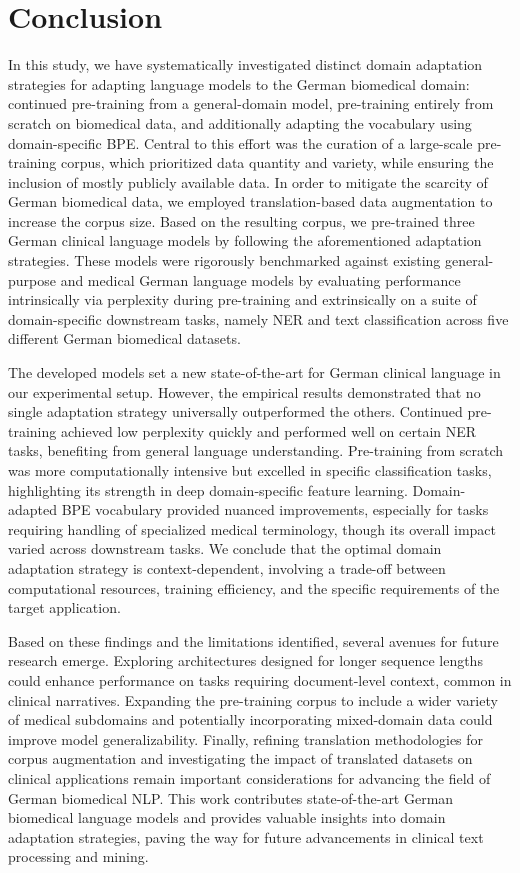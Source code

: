 \chapter{Conclusion} \label{chap:conclusion}

In this study, we have systematically investigated distinct domain adaptation
strategies for adapting language models to the German biomedical domain:
continued pre-training from a general-domain model, pre-training entirely from
scratch on biomedical data, and additionally adapting the vocabulary using
domain-specific BPE. Central to this effort was the curation of a large-scale
pre-training corpus, which prioritized data quantity and variety, while ensuring
the inclusion of mostly publicly available data. In order to mitigate the
scarcity of German biomedical data, we employed translation-based data
augmentation to increase the corpus size. Based on the resulting corpus, we
pre-trained three German clinical language models by following the
aforementioned adaptation strategies. These models were rigorously benchmarked
against existing general-purpose and medical German language models by
evaluating performance intrinsically via perplexity during pre-training and
extrinsically on a suite of domain-specific downstream tasks, namely NER and
text classification across five different German biomedical datasets.

The developed models set a new state-of-the-art for German clinical language in
our experimental setup. However, the empirical results demonstrated that no
single adaptation strategy universally outperformed the others. Continued
pre-training achieved low perplexity quickly and performed well on certain NER
tasks, benefiting from general language understanding. Pre-training from scratch
was more computationally intensive but excelled in specific classification
tasks, highlighting its strength in deep domain-specific feature learning.
Domain-adapted BPE vocabulary provided nuanced improvements, especially for
tasks requiring handling of specialized medical terminology, though its overall
impact varied across downstream tasks. We conclude that the optimal domain
adaptation strategy is context-dependent, involving a trade-off between
computational resources, training efficiency, and the specific requirements of
the target application.

Based on these findings and the limitations identified, several avenues for
future research emerge. Exploring architectures designed for longer sequence
lengths could enhance performance on tasks requiring document-level context,
common in clinical narratives. Expanding the pre-training corpus to include a
wider variety of medical subdomains and potentially incorporating mixed-domain
data could improve model generalizability. Finally, refining translation
methodologies for corpus augmentation and investigating the impact of translated
datasets on clinical applications remain important considerations for advancing
the field of German biomedical NLP. This work contributes state-of-the-art
German biomedical language models and provides valuable insights into domain
adaptation strategies, paving the way for future advancements in clinical text
processing and mining.
